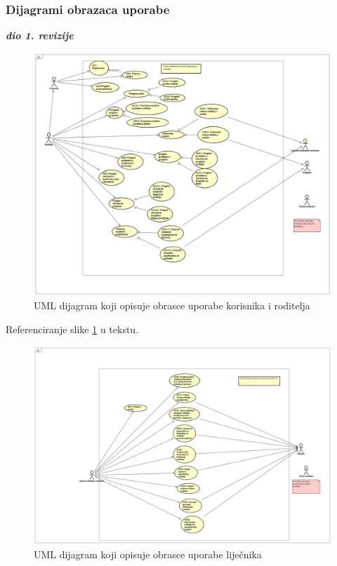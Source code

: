 					
				\subsubsection{Dijagrami obrazaca uporabe}
					\textbf{\textit{dio 1. revizije}}\\
						\begin{figure}[H]
						\includegraphics[width=\textwidth]{slike/UCroditelj.PNG} %
						\caption{UML dijagram koji opisuje obrasce uporabe korisnika i roditelja}
						\label{fig:promjene3} %
					\end{figure}
					
					Referenciranje slike \ref{fig:promjene3} u tekstu.
					
					\begin{figure}[H]
						\includegraphics[width=\textwidth]{slike/UCliječnik.PNG} %
						\caption{UML dijagram koji opisuje obrasce uporabe liječnika}
						\label{fig:promjene4} %
					\end{figure}
					
